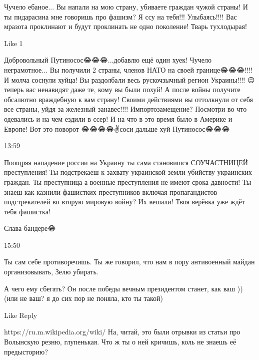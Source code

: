 {%

Чучело ебаное... Вы напали на мою страну, убиваете граждан чужой страны! И ты
пидарасина мне говоришь про фашизм? Я ссу на тебя!!! Улыбаясь!!!! Вас мразота
проклинают и будут проклинать не одно поколение! Тварь тухлодырая!

    Like 1


Добровольный Путиносос😂😂😂...добавлю ещё один хуек! Чучело неграмотное... Вы
получили 2 страны, членов НАТО на своей границе😂😂😂!!!! И молча соснули
хуйца! Вы раздолбали весь рускочзычный регион Украины!!!! 😉 теперь вас
ненавидят даже те, кому вы были похуй! А после войны получите обсалютно
враждебную к вам страну! Своими действиями вы оттолкнули от себя все страны,
уйдя за железный занавес!!!! Импортозамещение? Посмотри во что одевались и на
чем ездили в ссер! И на что в это время было в Америке и Европе! Вот это
поворот 😂😂😂😂✌соси дальше хуй Путиносос😂😂😂

13:59

Поощряя нападение россии на Украину ты сама становишся СОУЧАСТНИЦЕЙ преступления!
Ты подстрекаеш к захвату украинской земли убийству украинских граждан.
Ты преступница а военные преступления не имеют срока давности!
Ты знаеш как казнили фашистких преступников включая пропагандистов подстрекателей во вторую мировую войну?
Их вешали! Твоя верёвка уже ждёт тебя фашистка!

Слава бандере😂

15:50

Ты сам себе противоречишь. Ты же говорил, что нам в пору антивоенный майдан
организовывать, Зелю убирать.

А чего ему сбегать? Он после победы вечным президентом станет, как ваш )) (или
не ваш? я до сих пор не поняла, кто ты такой)

    Like
    Reply


https://ru.m.wikipedia.org/wiki/%
На, читай, это были отрывки из статьи про Волынскую резню, глупенькая. Что ж ты о ней кричишь, коль не знаешь её предысторию?


}
